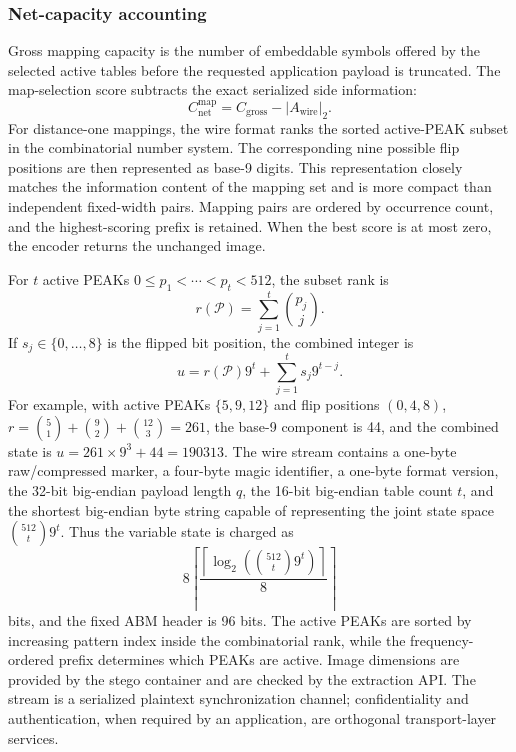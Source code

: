 \documentclass[a4paper,fleqn]{cas-dc}
\begin{document}
\subsubsection*{Net-capacity accounting}

Gross mapping capacity is the number of embeddable symbols offered by the
selected active tables before the requested application payload is truncated.
The map-selection score subtracts the exact serialized side information:
\begin{equation}
C_{\mathrm{net}}^{\mathrm{map}}=C_{\mathrm{gross}}-|A_{\mathrm{wire}}|_2.
\label{eq:net-capacity}
\end{equation}
For distance-one mappings, the wire format ranks the sorted active-PEAK subset
in the combinatorial number system. The corresponding nine possible flip
positions are then represented as base-9 digits. This representation closely
matches the information content of the mapping set and is more compact than
independent fixed-width pairs. Mapping pairs are ordered by occurrence count,
and the highest-scoring prefix is retained. When the best score is at most
zero, the encoder returns the unchanged image.

For $t$ active PEAKs $0\le p_1<\cdots<p_t<512$, the subset rank is
\begin{equation}
r(\mathcal P)=\sum_{j=1}^{t}\binom{p_j}{j}.
\label{eq:combination-rank}
\end{equation}
If $s_j\in\{0,\ldots,8\}$ is the flipped bit position, the combined integer is
\begin{equation}
u=r(\mathcal P)9^t+\sum_{j=1}^{t}s_j9^{t-j}.
\label{eq:enumerative-state}
\end{equation}
For example, with active PEAKs $\{5,9,12\}$ and flip positions $(0,4,8)$,
$r=\binom51+\binom92+\binom{12}3=261$, the base-9 component is 44, and the
combined state is $u=261\times9^3+44=190313$.
The wire stream contains a one-byte raw/compressed marker, a four-byte magic
identifier, a one-byte format version, the 32-bit big-endian payload length
$q$, the 16-bit big-endian table count $t$, and the shortest big-endian byte
string capable of representing the joint state space
$\binom{512}{t}9^t$. Thus the variable state is charged as
\begin{equation}
8\left\lceil
\frac{\left\lceil\log_2\left(\binom{512}{t}9^t\right)\right\rceil}{8}
\right\rceil
\label{eq:wire-state-bytes}
\end{equation}
bits, and the fixed ABM header is 96 bits. The active PEAKs are sorted by
increasing pattern index inside the combinatorial rank, while the
frequency-ordered prefix determines which PEAKs are active. Image dimensions
are provided by the stego container and are checked by the extraction API. The
stream is a serialized plaintext synchronization channel; confidentiality and
authentication, when required by an application, are orthogonal transport-layer
services.
\end{document}
